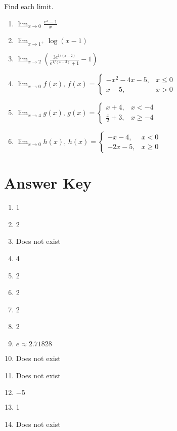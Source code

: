 Find each limit.
\begin{multicols}{2}
\begin{enumerate}	\setcounter{enumi}{\value{Review}}
	\item $\lim_{x \to 0} \frac{e^x - 1}{x}$
	\item $\lim_{x \to 1^+} \log(x-1)$
	\item $\lim_{x \to 2} \left(\frac{3e^{1/(x-2)}}{e^{1/(x-2)}+1}-1\right)$
	\item $\lim_{x \to 0} f(x), \, f(x) =  \begin{cases} -x^2-4x-5, & x \leq 0 \\ x-5, & x > 0 \end{cases}$
	\item $\lim_{x \to 4} g(x), \, g(x) = \begin{cases} x+4, & x < -4 \\ \frac{x}{2}+3, & x \geq -4 \end{cases}$
	\item $\lim_{x \to 0} h(x), \, h(x) = \begin{cases} -x-4, & x< 0 \\ -2x-5, & x \geq 0 \end{cases}$
\end{enumerate}
\end{multicols}

\newpage

\section{Answer Key}

\begin{enumerate}
	\item 1
    \item 2 
    \item Does not exist
    \item 4
    \item 2
    \item 2
    \item 2
    \item 2
    \item $e \approx 2.71828$
    \item Does not exist
    \item Does not exist
    \item $-5$
    \item 1
    \item Does not exist
\end{enumerate}